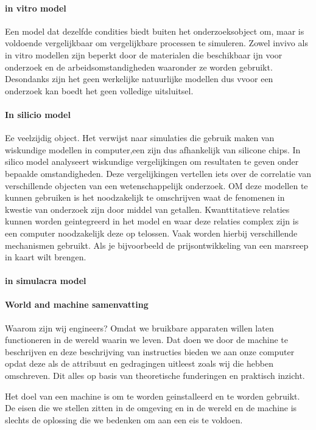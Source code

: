 \paragraph{in vitro model}
Een model dat dezelfde condities biedt  buiten het onderzoeksobject om, maar is voldoende vergelijkbaar om vergelijkbare processen te simuleren.
Zowel invivo als in vitro modellen zijn beperkt door de materialen die beschikbaar ijn voor onderzoek en de arbeidsomstandigheden waaronder ze worden gebruikt. Desondanks zijn het geen werkelijke natuurlijke modellen dus vvoor een onderzoek kan boedt het geen volledige uitsluitsel.
\paragraph{In silicio model}
Ee veelzijdig object. Het verwijst naar simulaties die gebruik maken van wiskundige modellen in computer,een zijn dus afhankelijk van silicone chips. In silico model analyseert  wiskundige vergelijkingen om resultaten te geven onder bepaalde omstandigheden. Deze vergelijkingen vertellen iets over de correlatie van verschillende objecten van een wetenschappelijk onderzoek. OM deze modellen te kunnen gebruiken is het noodzakelijk te omschrijven waat de fenomenen in kwestie van onderzoek zijn door middel van getallen. Kwanttitatieve relaties kunnen worden geintegreerd in het model en waar deze relaties complex zijn is een computer noodzakelijk deze op telossen. Vaak worden hierbij verschillende mechanismen gebruikt. Als je bijvoorbeeld de prijsontwikkeling van een marsreep in kaart wilt brengen.
\paragraph{in simulacra model}

\paragraph{World and machine samenvatting}
Waarom zijn wij engineers? Omdat we bruikbare apparaten willen laten functioneren in de wereld waarin we leven. Dat doen we door de machine te beschrijven en deze beschrijving van instructies bieden we aan onze computer opdat deze als de attribuut en gedragingen uitleest zoals wij die hebben omschreven. Dit alles op basis van theoretische funderingen en praktisch inzicht. 

Het doel van een machine is om te worden geinstalleerd en te worden gebruikt. De eisen die we stellen zitten in de omgeving en in de wereld en de machine is slechts de oplossing die we bedenken om aan een eis te voldoen. 

